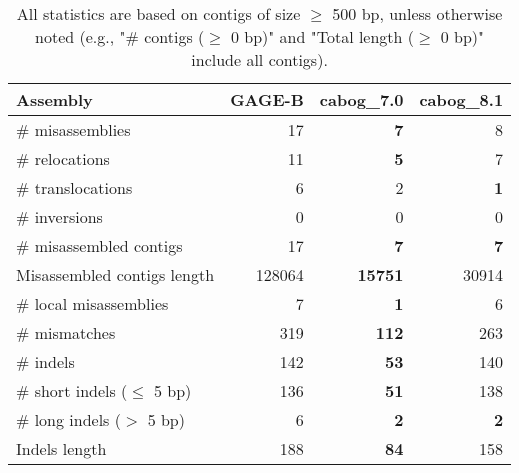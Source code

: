 \documentclass[12pt,a4paper]{article}
\begin{document}
\begin{table}[ht]
\begin{center}
\caption{All statistics are based on contigs of size $\geq$ 500 bp, unless otherwise noted (e.g., "\# contigs ($\geq$ 0 bp)" and "Total length ($\geq$ 0 bp)" include all contigs).}
\begin{tabular}{|l*{3}{|r}|}
\hline
Assembly & GAGE-B & cabog\_7.0 & cabog\_8.1 \\ \hline
\# misassemblies & 17 & {\bf 7} & 8 \\ \hline
\hspace{5mm}\# relocations & 11 & {\bf 5} & 7 \\ \hline
\hspace{5mm}\# translocations & 6 & 2 & {\bf 1} \\ \hline
\hspace{5mm}\# inversions & 0 & 0 & 0 \\ \hline
\# misassembled contigs & 17 & {\bf 7} & {\bf 7} \\ \hline
Misassembled contigs length & 128064 & {\bf 15751} & 30914 \\ \hline
\# local misassemblies & 7 & {\bf 1} & 6 \\ \hline
\# mismatches & 319 & {\bf 112} & 263 \\ \hline
\# indels & 142 & {\bf 53} & 140 \\ \hline
\hspace{5mm}\# short indels ($\leq$ 5 bp) & 136 & {\bf 51} & 138 \\ \hline
\hspace{5mm}\# long indels ($>$ 5 bp) & 6 & {\bf 2} & {\bf 2} \\ \hline
Indels length & 188 & {\bf 84} & 158 \\ \hline
\end{tabular}
\end{center}
\end{table}
\end{document}
